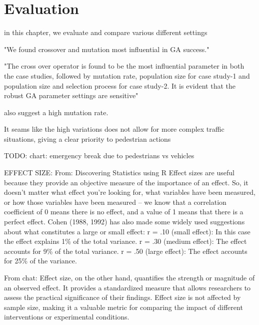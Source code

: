 \chapter{Evaluation}
\label{chap:evaluation}
in this chapter, we evaluate and compare various different settings

"We found crossover and mutation most influential in GA success."\cite{mills_determining_2015}

"The cross over operator is found to be the most influential parameter in both the case studies, followed by mutation rate, population size for case study-1 and population size and selection process for case study-2. It is evident that the robust GA parameter settings are sensitive"\cite{majumdar_genetic_2015}

\cite{boyabatli_parameter_2004} also suggest a high mutation rate.



It seams like the high variations does not allow for more complex traffic situations, giving a clear priority to pedestrian actions

TODO: chart: emergency break due to pedestrians vs vehicles




EFFECT SIZE:
From: Discovering Statistics using R
Effect sizes are useful because they provide an objective measure of the importance of an effect. So, it doesn’t matter what effect you’re looking for, what variables have been measured, or how those variables have been measured – we know that a correlation coefficient of 0 means there is no effect, and a value of 1 means that there is a perfect effect.
Cohen (1988, 1992) has also made some widely used suggestions about what constitutes a large or small effect: 
r = .10 (small effect): In this case the effect explains 1\% of the total variance. 
r = .30 (medium effect): The effect accounts for 9\% of the total variance. 
r = .50 (large effect): The effect accounts for 25\% of the variance.


From chat: 
Effect size, on the other hand, quantifies the strength or magnitude of an observed effect. It provides a standardized measure that allows researchers to assess the practical significance of their findings.
Effect size is not affected by sample size, making it a valuable metric for comparing the impact of different interventions or experimental conditions.





